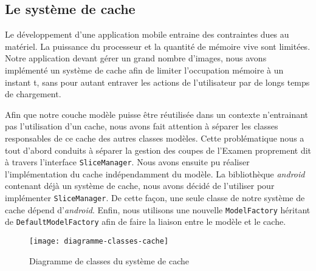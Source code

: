 \subsection{Le système de cache}

Le développement d'une application mobile entraine des contraintes dues au matériel. La puissance du processeur et la quantité de mémoire vive sont limitées. Notre application devant gérer un grand nombre d'images, nous avons implémenté un système de cache afin de limiter l'occupation mémoire à un instant t, sans pour autant entraver les actions de l'utilisateur par de longs temps de chargement.

Afin que notre couche modèle puisse être réutilisée dans un contexte n'entrainant pas l'utilisation d'un cache, nous avons fait attention à séparer les classes responsables de ce cache des autres classes modèles. Cette problématique nous a tout d'abord conduits à séparer la gestion des coupes de l'Examen proprement dit à travers l'interface \verb+SliceManager+. Nous avons ensuite pu réaliser l'implémentation du cache indépendamment du modèle. La bibliothèque \emph{android} contenant déjà un système de cache, nous avons décidé de l'utiliser pour implémenter \verb+SliceManager+. De cette façon, une seule classe de notre système de cache dépend d'\emph{android}. Enfin, nous utilisons une nouvelle \verb+ModelFactory+ héritant de \verb+DefaultModelFactory+ afin de faire la liaison entre le modèle et le cache.

\begin{figure}[h]
\begin{center}
	\texttt{[image: diagramme-classes-cache]}
\end{center}
	\caption{Diagramme de classes du système de cache}
	\label{classes-cache}
\end{figure}